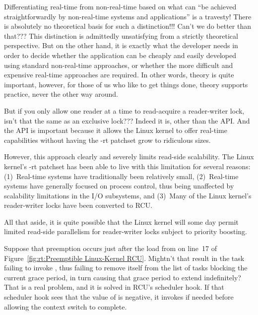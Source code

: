 \QuickQ{}
	Differentiating real-time from non-real-time based on what can
	``be achieved straightforwardly by non-real-time systems and
	applications'' is a travesty!
	There is absolutely no theoretical basis for such a distinction!!!
	Can't we do better than that???
\QuickA{}
	This distinction is admittedly unsatisfying from a strictly
	theoretical perspective.
	But on the other hand, it is exactly what the developer needs
	in order to decide whether the application can be cheaply and
	easily developed using standard non-real-time approaches, or
	whether the more difficult and expensive real-time approaches
	are required.
	In other words, theory is quite important, however, for those
	of us who like to get things done, theory supports practice,
	never the other way around.

\QuickQ{}
	But if you only allow one reader at a time to read-acquire
	a reader-writer lock, isn't that the same as an exclusive
	lock???
\QuickA{}
	Indeed it is, other than the API.
	And the API is important because it allows the Linux kernel
	to offer real-time capabilities without having the -rt patchset
	grow to ridiculous sizes.

	However, this approach clearly and severely limits read-side
	scalability.
	The Linux kernel's -rt patchset has been able to live with this
	limitation for several reasons: (1)~Real-time systems have
	traditionally been relatively small, (2)~Real-time systems
	have generally focused on process control, thus being unaffected
	by scalability limitations in the I/O subsystems, and
	(3)~Many of the Linux kernel's reader-writer locks have been
	converted to RCU.

	All that aside, it is quite possible that the Linux kernel
	will some day permit limited read-side parallelism for
	reader-writer locks subject to priority boosting.

\QuickQ{}
	Suppose that preemption occurs just after the load from
	 on line~17 of
	Figure~\ref{fig:rt:Preemptible Linux-Kernel RCU}.
	Mightn't that result in the task failing to invoke
	, thus failing to remove itself
	from the list of tasks blocking the current grace period,
	in turn causing that grace period to extend indefinitely?
\QuickA{}
	That is a real problem, and it is solved in RCU's scheduler hook.
	If that scheduler hook sees that the value of
	 is negative, it invokes
	 if needed before allowing
	the context switch to complete.

